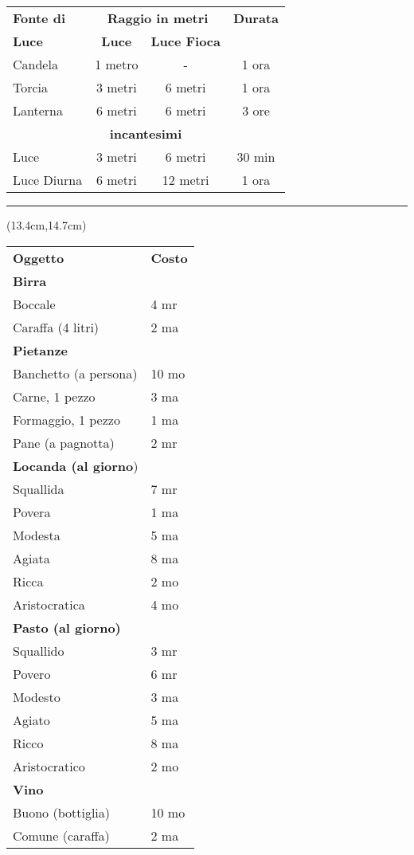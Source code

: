 \documentclass[a4paper,12 pt,openany]{book}
\newcommand{\riga}{\rule{\textwidth}{0.4pt}}
\begin{document}
\begin{textblock*}{12cm}
\begin{tabular}{l|cc|c}
\textbf{Fonte di} &\multicolumn{2}{c}{\textbf{Raggio in metri}}& \textbf{Durata}  \\
\textbf{Luce}& \textbf{Luce} & \textbf{Luce Fioca} &\\
Candela  & 1 metro & -  & 1 ora\\
Torcia & 3 metri & 6 metri  & 1 ora\\
Lanterna & 6 metri & 6 metri  & 3 ore \\
\multicolumn{4}{c}{\textbf{incantesimi}}\\
Luce 		 & 3 metri & 6 metri  &30 min \\
Luce Diurna  & 6 metri & 12 metri & 1 ora \\
\end{tabular}


\riga

\end{textblock*}

\begin{textblock*}{6cm}(13.4cm,14.7cm) %

\begin{tabular}{ll}
\textbf{Oggetto}&\textbf{Costo}\\
\textbf{Birra}&\\
Boccale&4 mr\\
Caraffa (4 litri)&2 ma\\
\textbf{Pietanze} &\\
Banchetto (a persona)&10 mo\\
Carne, 1 pezzo&3 ma\\
Formaggio, 1 pezzo&1 ma\\
Pane (a pagnotta)&2 mr\\
\textbf{Locanda (al giorno})&\\
Squallida&7 mr\\
Povera&1 ma\\
Modesta&5 ma\\
Agiata&8 ma\\
Ricca&2 mo\\
Aristocratica&4 mo\\
\textbf{Pasto (al giorno)}&\\
Squallido&3 mr\\
Povero&6 mr\\
Modesto&3 ma\\
Agiato&5 ma\\
Ricco&8 ma\\
Aristocratico&2 mo\\
\textbf{Vino}&\\
Buono (bottiglia)&10 mo\\
Comune (caraffa)&2 ma\\
\end{tabular}

\end{textblock*}
\end{document}
